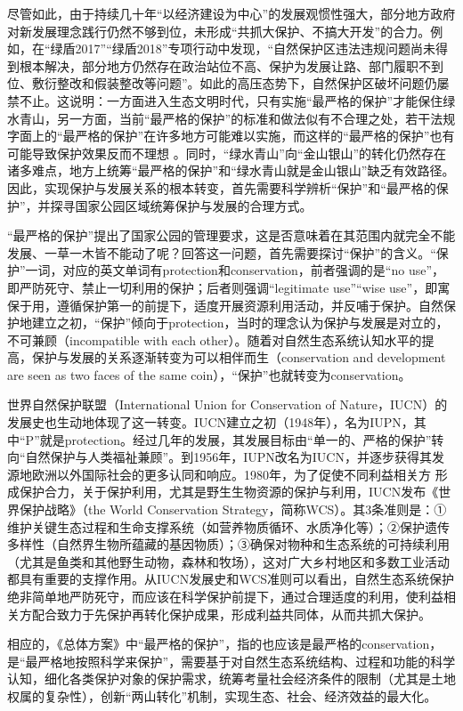 \documentclass[]{book}
\begin{document}
尽管如此，由于持续几十年``以经济建设为中心''的发展观惯性强大，部分地方政府对新发展理念践行仍然不够到位，未形成``共抓大保护、不搞大开发''的合力。例如，在``绿盾2017''``绿盾2018''专项行动中发现，``自然保护区违法违规问题尚未得到根本解决，部分地方仍然存在政治站位不高、保护为发展让路、部门履职不到位、敷衍整改和假装整改等问题''。如此的高压态势下，自然保护区破坏问题仍屡禁不止。这说明：一方面进入生态文明时代，只有实施``最严格的保护''才能保住绿水青山，另一方面，当前``最严格的保护''的标准和做法似有不合理之处，若干法规字面上的``最严格的保护''在许多地方可能难以实施，而这样的``最严格的保护''也有可能导致保护效果反而不理想 。同时，``绿水青山''向``金山银山''的转化仍然存在诸多难点，地方上统筹``最严格的保护''和``绿水青山就是金山银山''缺乏有效路径。因此，实现保护与发展关系的根本转变，首先需要科学辨析``保护''和``最严格的保护''，并探寻国家公园区域统筹保护与发展的合理方式。

``最严格的保护''提出了国家公园的管理要求，这是否意味着在其范围内就完全不能发展、一草一木皆不能动了呢？回答这一问题，首先需要探讨``保护''的含义。``保护''一词，对应的英文单词有protection和conservation，前者强调的是``no use''，即严防死守、禁止一切利用的保护；后者则强调``legitimate use''``wise use''，即寓保于用，遵循保护第一的前提下，适度开展资源利用活动，并反哺于保护。自然保护地建立之初，``保护''倾向于protection，当时的理念认为保护与发展是对立的，不可兼顾（incompatible with each other）。随着对自然生态系统认知水平的提高，保护与发展的关系逐渐转变为可以相伴而生（conservation and development are seen as two faces of the same coin），``保护''也就转变为conservation。

世界自然保护联盟（International Union for Conservation of Nature，IUCN）的发展史也生动地体现了这一转变。IUCN建立之初（1948年），名为IUPN，其中``P''就是protection。经过几年的发展，其发展目标由``单一的、严格的保护''转向``自然保护与人类福祉兼顾''。到1956年，IUPN改名为IUCN，并逐步获得其发源地欧洲以外国际社会的更多认同和响应。1980年，为了促使不同利益相关方 形成保护合力，关于保护利用，尤其是野生生物资源的保护与利用，IUCN发布《世界保护战略》（the World Conservation Strategy，简称WCS）。其3条准则是：①维护关键生态过程和生命支撑系统（如营养物质循环、水质净化等）；②保护遗传多样性（自然界生物所蕴藏的基因物质）；③确保对物种和生态系统的可持续利用（尤其是鱼类和其他野生动物，森林和牧场），这对广大乡村地区和多数工业活动都具有重要的支撑作用。从IUCN发展史和WCS准则可以看出，自然生态系统保护绝非简单地严防死守，而应该在科学保护前提下，通过合理适度的利用，使利益相关方配合致力于先保护再转化保护成果，形成利益共同体，从而共抓大保护。

相应的，《总体方案》中``最严格的保护''，指的也应该是最严格的conservation，是``最严格地按照科学来保护''，需要基于对自然生态系统结构、过程和功能的科学认知，细化各类保护对象的保护需求，统筹考量社会经济条件的限制（尤其是土地权属的复杂性），创新``两山转化''机制，实现生态、社会、经济效益的最大化。
\end{document}
